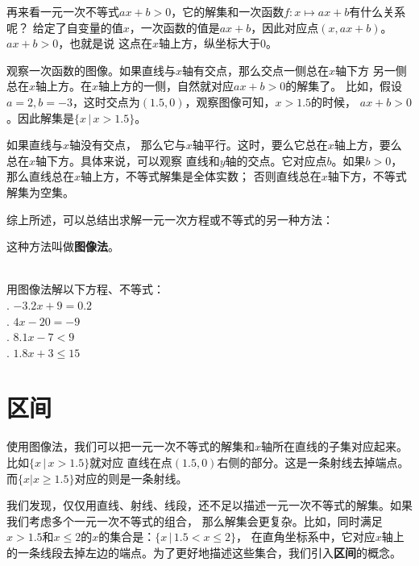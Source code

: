 \documentclass[12pt,UTF8]{ctexbook}
\begin{document}
再来看一元一次不等式$ax + b > 0$，它的解集和一次函数$f:x\mapsto ax + b$有什么关系呢？
给定了自变量的值$x$，一次函数的值是$ax + b$，因此对应点$(x, ax + b)$。$ax + b > 0$，也就是说
这点在$x$轴上方，纵坐标大于$0$。

观察一次函数的图像。如果直线与$x$轴有交点，那么交点一侧总在$x$轴下方
另一侧总在$x$轴上方。在$x$轴上方的一侧，自然就对应$ax + b > 0$的解集了。
比如，假设$a = 2, b = -3$，这时交点为$(1.5, 0)$，观察图像可知，$x > 1.5$的时候，
$ax + b > 0$。因此解集是$\{x \, | \, x > 1.5\}$。

如果直线与$x$轴没有交点，
那么它与$x$轴平行。这时，要么它总在$x$轴上方，要么总在$x$轴下方。具体来说，可以观察
直线和$y$轴的交点。它对应点$b$。如果$b>0$，那么直线总在$x$轴上方，不等式解集是全体实数；
否则直线总在$x$轴下方，不等式解集为空集。

综上所述，可以总结出求解一元一次方程或不等式的另一种方法：
\begin{center}
\end{center}

这种方法叫做\textbf{图像法}。

\begin{xt}\label{xt:5-3-0}
    \mbox{}\\
    用图像法解以下方程、不等式：\\
    . $-3.2x + 9 = 0.2$\\
    . $4x - 20 = -9$\\
    . $8.1x -7 < 9$\\
    . $1.8x + 3 \leqslant 15$
\end{xt}

\section{区间}
使用图像法，我们可以把一元一次不等式的解集和$x$轴所在直线的子集对应起来。比如$\{x \, | \, x > 1.5\}$就对应
直线在点$(1.5, 0)$右侧的部分。这是一条射线去掉端点。而$\{x | x \geqslant 1.5\}$对应的则是一条射线。

我们发现，仅仅用直线、射线、线段，还不足以描述一元一次不等式的解集。如果我们考虑多个一元一次不等式的组合，
那么解集会更复杂。比如，同时满足$x > 1.5$和$x \leqslant 2$的$x$的集合是：$\{x \, | \, 1.5 < x \leqslant 2\}$，
在直角坐标系中，它对应$x$轴上的一条线段去掉左边的端点。为了更好地描述这些集合，我们引入\textbf{区间}的概念。
\end{document}
